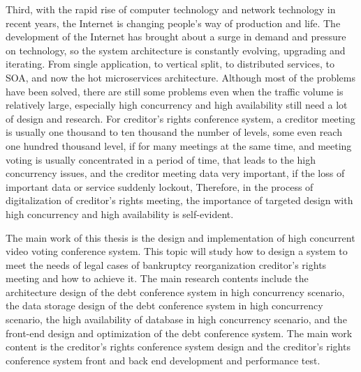 \begin{digest}
Third, with the rapid rise of computer technology and network technology in recent years, the Internet is changing people's way of production and life. The development of the Internet has brought about a surge in demand and pressure on technology, so the system architecture is constantly evolving, upgrading and iterating. From single application, to vertical split, to distributed services, to SOA, and now the hot microservices architecture. Although most of the problems have been solved, there are still some problems even when the traffic volume is relatively large, especially high concurrency and high availability still need a lot of design and research. For creditor's rights conference system, a creditor meeting is usually one thousand to ten thousand the number of levels, some even reach one hundred thousand level, if for many meetings at the same time, and meeting voting is usually concentrated in a period of time, that leads to the high concurrency issues, and the creditor meeting data very important, if the loss of important data or service suddenly lockout, Therefore, in the process of digitalization of creditor's rights meeting, the importance of targeted design with high concurrency and high availability is self-evident.



The main work of this thesis is the design and implementation of high concurrent video voting conference system. This topic will study how to design a system to meet the needs of legal cases of bankruptcy reorganization creditor's rights meeting and how to achieve it. The main research contents include the architecture design of the debt conference system in high concurrency scenario, the data storage design of the debt conference system in high concurrency scenario, the high availability of database in high concurrency scenario, and the front-end design and optimization of the debt conference system. The main work content is the creditor's rights conference system design and the creditor's rights conference system front and back end development and performance test.
\end{digest}
